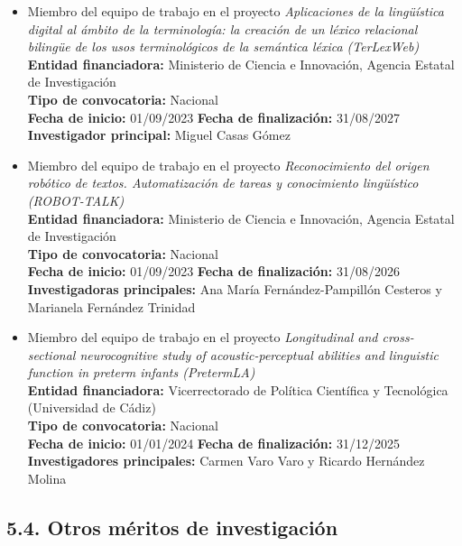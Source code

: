 \begin{itemize}
  \item Miembro del equipo de trabajo en el proyecto \textit{Aplicaciones de la lingüística digital al ámbito de la terminología: la creación de  un léxico relacional bilingüe de los usos terminológicos de la semántica léxica  (TerLexWeb)}\\
  \textbf{Entidad financiadora:} Ministerio de Ciencia e Innovación, Agencia Estatal de Investigación\\
  \textbf{Tipo de convocatoria:} Nacional\\
  \textbf{Fecha de inicio:} 01/09/2023 \hfill \textbf{Fecha de finalización:} 31/08/2027\\
  \textbf{Investigador principal:} Miguel Casas Gómez\\

  \item Miembro del equipo de trabajo en el proyecto \textit{Reconocimiento del origen robótico de textos. Automatización de tareas y conocimiento lingüístico (ROBOT-TALK)}\\
  \textbf{Entidad financiadora:} Ministerio de Ciencia e Innovación, Agencia Estatal de Investigación\\
  \textbf{Tipo de convocatoria:} Nacional\\
  \textbf{Fecha de inicio:} 01/09/2023 \hfill \textbf{Fecha de finalización:} 31/08/2026\\
  \textbf{Investigadoras principales:} Ana María Fernández-Pampillón Cesteros y Marianela Fernández Trinidad\\

  \item Miembro del equipo de trabajo en el proyecto \textit{Longitudinal and cross-sectional neurocognitive study of acoustic-perceptual abilities and linguistic function in preterm infants (PretermLA)}\\
  \textbf{Entidad financiadora:} Vicerrectorado de Política Científica y Tecnológica (Universidad de Cádiz)\\
  \textbf{Tipo de convocatoria:} Nacional\\
  \textbf{Fecha de inicio:} 01/01/2024 \hfill \textbf{Fecha de finalización:} 31/12/2025\\
  \textbf{Investigadores principales:} Carmen Varo Varo y Ricardo Hernández Molina\\

\end{itemize}

\subsection*{5.4. Otros méritos de investigación}

